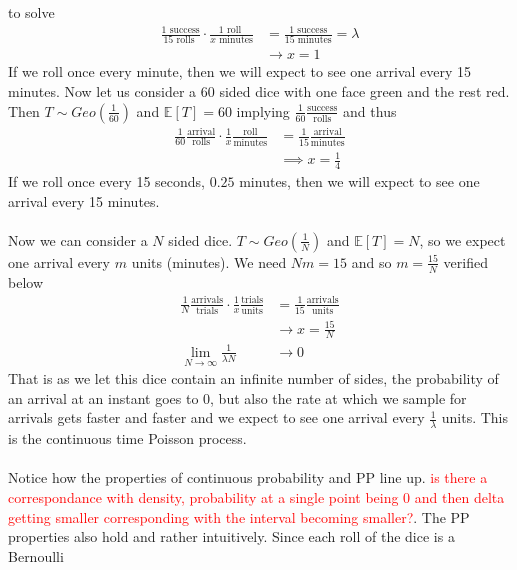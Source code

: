 \documentclass[11pt]{scrartcl}
\begin{document}
   to solve \begin{align*}
     \frac{1\text{ success}}{15\text{ rolls }}\cdot \frac{1\text{ roll
     }}{x\text{ minutes}} &= \frac{1 \text{ success}}{15\text{ minutes}}
     = \lambda \\
                          &\rightarrow x =1
   \end{align*} If we roll once every minute, then we will expect to see one
   arrival every 15 minutes. Now let us consider a 60 sided dice with one face
   green and the rest red. Then $T\sim Geo(\frac{1}{60})$ and $\mathbb{E}[T]
   = 60 $ implying $\frac{1}{60} \frac{\text{success}}{\text{rolls}}$ and thus
   \begin{align*}
     \frac{1}{60}\frac{\text{arrival}}{\text{rolls}} \cdot
     \frac{1}{x}\frac{\text{roll}}{\text{minutes}} &=
     \frac{1}{15}\frac{\text{arrival}}{\text{minutes}} \\ &\implies
     x = \frac{1}{4}
   \end{align*} If we roll once every 15 seconds, $0.25$ minutes, then we will
   expect to see one arrival every 15 minutes. \\\\ Now we can consider a $N$
   sided dice. $T\sim Geo(\frac{1}{N})$ and $\mathbb{E}[T] = N $, so we expect
   one arrival every $m$ units (minutes). We need $Nm=15$ and so
   $m=\frac{15}{N}$ verified below \begin{align*}
     \frac{1}{N}\frac{\text{arrivals}}{\text{trials}} \cdot
     \frac{1}{x}\frac{\text{trials}}{\text{units}} &=
     \frac{1}{15}\frac{\text{arrivals}}{\text{units}} \\ &\to x = \frac{15}{N}
     \\
     \lim_{N\to \infty} \frac{1}{\lambda N} &\to 0
   \end{align*} That is as we let this dice contain an infinite number of
   sides, the probability of an arrival at an instant goes to 0, but also the
   rate at which we sample for arrivals gets faster and faster and we expect to
   see one arrival every $\frac{1}{\lambda }$ units. This is the continuous
   time Poisson process. \\\\ Notice how the properties of continuous
   probability and PP line up. \textcolor{red}{is there a correspondance with
   density, probability at a single point being 0 and then delta getting
 smaller corresponding with the interval becoming smaller?}. The PP properties
 also hold and rather intuitively. Since each roll of the dice is a Bernoulli
\end{document}
